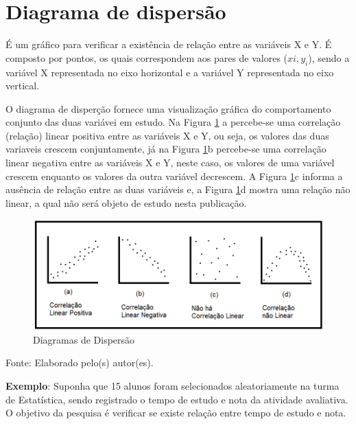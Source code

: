 \documentclass[12pt,brazil,oneside]{book}
\begin{document}
\hypertarget{diagrama-de-dispersao}{%
\section{Diagrama de dispersão}\label{diagrama-de-dispersao}}

É um gráfico para verificar a existência de relação entre as variáveis X
e Y. É composto por pontos, os quais correspondem aos pares de valores
(\(xi, y_i\)), sendo a variável X representada no eixo horizontal e a
variável Y representada no eixo vertical.

O diagrama de disperção fornece uma visualização gráfica do
comportamento conjunto das duas variávei em estudo. Na Figura
\ref{fig:diag} a percebe-se uma correlação (relação) linear positiva
entre as variáveis X e Y, ou seja, os valores das duas variaveis crescem
conjuntamente, já na Figura \ref{fig:diag}b percebe-se uma correlação
linear negativa entre as variáveis X e Y, neste caso, os valores de uma
variável crescem enquanto os valores da outra variável decrescem. A
Figura \ref{fig:diag}c informa a ausência de relação entre as duas
variáveis e, a Figura \ref{fig:diag}d mostra uma relação não linear, a
qual não será objeto de estudo nesta publicação.

\begin{figure}[H]

{\centering \includegraphics[width=0.6\linewidth]{correlacao1} 

}

\caption{Diagramas de Dispersão}\label{fig:diag}
\end{figure}

Fonte: Elaborado pelo(s) autor(es).

\textbf{Exemplo}: Suponha que 15 alunos foram selecionados
aleatoriamente na turma de Estatística, sendo registrado o tempo de
estudo e nota da atividade avaliativa. O objetivo da pesquisa é
verificar se existe relação entre tempo de estudo e nota.
\end{document}
